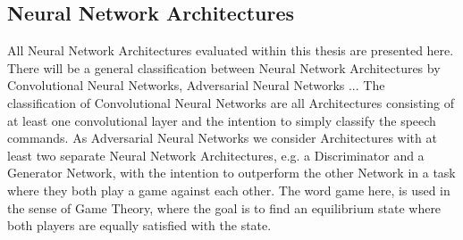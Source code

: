 \subsection{Neural Network Architectures}\label{sec:nn_arch}
All Neural Network Architectures evaluated within this thesis are presented here.
There will be a general classification between Neural Network Architectures by Convolutional Neural Networks, Adversarial Neural Networks ...
The classification of Convolutional Neural Networks are all Architectures consisting of at least one convolutional layer and the intention to simply classify the speech commands.
As Adversarial Neural Networks we consider Architectures with at least two separate Neural Network Architectures, e.g. a Discriminator and a Generator Network, with the intention to outperform the other Network in a task where they both play a game against each other.
The word game here, is used in the sense of Game Theory, where the goal is to find an equilibrium state where both players are equally satisfied with the state.